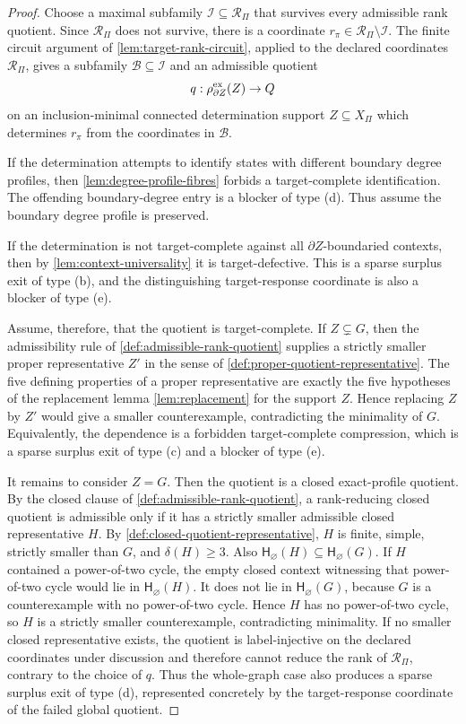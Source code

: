 \documentclass[11pt]{article}
\newcommand{\profile}{\mathsf H}
\begin{document}
\begin{proof}
Choose a maximal subfamily \(\mathcal I\subseteq\mathcal R_\Pi\) that survives
every admissible rank quotient.  Since \(\mathcal R_\Pi\) does not survive,
there is a coordinate \(r_\pi\in\mathcal R_\Pi\setminus\mathcal I\).  The
finite circuit argument of \cref{lem:target-rank-circuit}, applied to the
declared coordinates \(\mathcal R_\Pi\), gives a subfamily
\(\mathcal B\subseteq\mathcal I\) and an admissible quotient
\[
q:\rho_{\partial Z}^{\rm ex}(Z)\to Q
\]
on an inclusion-minimal connected determination support \(Z\subseteq X_\Pi\)
which determines \(r_\pi\) from the coordinates in \(\mathcal B\).

If the determination attempts to identify states with different boundary degree
profiles, then \cref{lem:degree-profile-fibres} forbids a target-complete
identification.  The offending boundary-degree entry is a blocker of type (d).
Thus assume the boundary degree profile is preserved.

If the determination is not target-complete against all
\(\partial Z\)-boundaried contexts, then by
\cref{lem:context-universality} it is target-defective.  This is a sparse
surplus exit of type (b), and the distinguishing target-response coordinate is
also a blocker of type (e).

Assume, therefore, that the quotient is target-complete.  If \(Z\subsetneq G\),
then the admissibility rule of \cref{def:admissible-rank-quotient} supplies a
strictly smaller proper representative \(Z'\) in the sense of
\cref{def:proper-quotient-representative}.  The five defining properties of a
proper representative are exactly the five hypotheses of the replacement lemma
\cref{lem:replacement} for the support \(Z\).  Hence replacing \(Z\) by \(Z'\)
would give a smaller counterexample, contradicting the minimality of \(G\).
Equivalently, the dependence is a forbidden target-complete compression, which
is a sparse surplus exit of type (c) and a blocker of type (e).

It remains to consider \(Z=G\).  Then the quotient is a closed exact-profile
quotient.  By the closed clause of \cref{def:admissible-rank-quotient}, a
rank-reducing closed quotient is admissible only if it has a strictly smaller
admissible closed representative \(H\).  By
\cref{def:closed-quotient-representative}, \(H\) is finite, simple, strictly
smaller than \(G\), and \(\delta(H)\ge3\).  Also
\(\profile_\varnothing(H)\subseteq\profile_\varnothing(G)\).  If \(H\)
contained a power-of-two cycle, the empty closed context witnessing that power-of-two cycle
would lie in \(\profile_\varnothing(H)\).  It does not lie in
\(\profile_\varnothing(G)\), because \(G\) is a counterexample with no power-of-two cycle.  Hence \(H\) has no power-of-two cycle, so \(H\) is a strictly smaller
counterexample, contradicting minimality.  If no smaller closed representative
exists, the quotient is label-injective on the declared coordinates under
discussion and therefore cannot reduce the rank of \(\mathcal R_\Pi\), contrary
to the choice of \(q\).  Thus the whole-graph case also produces a sparse
surplus exit of type (d), represented concretely by the target-response
coordinate of the failed global quotient.
\end{proof}
\end{document}

